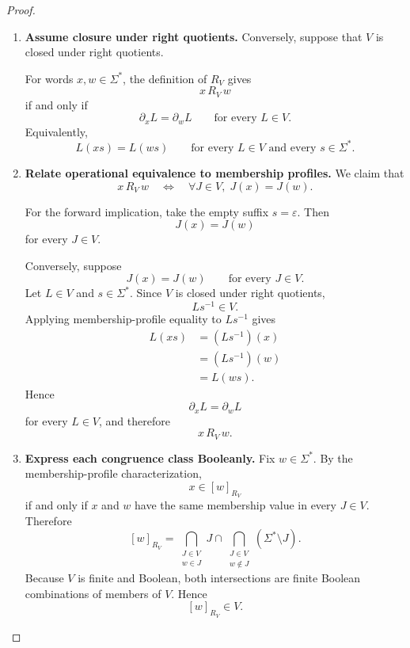 \begin{proof}
\begin{enumerate}
        \item \textbf{Assume closure under right quotients.}
        Conversely, suppose that \(V\) is closed under right quotients.

        For words \(x,w\in\Sigma^*\), the definition of \(R_V\) gives
        \[
            x\,R_V\,w
        \]
        if and only if
        \[
            \partial_xL
            =
            \partial_wL
            \qquad
            \text{for every }L\in V.
        \]
        Equivalently,
        \[
            L(xs)=L(ws)
            \qquad
            \text{for every }L\in V
            \text{ and every }s\in\Sigma^*.
        \]

        \item \textbf{Relate operational equivalence to membership profiles.}
        We claim that
        \[
            x\,R_V\,w
            \quad\Longleftrightarrow\quad
            \forall J\in V,\;
            J(x)=J(w).
        \]

        For the forward implication, take the empty suffix
        \(s=\varepsilon\). Then
        \[
            J(x)=J(w)
        \]
        for every \(J\in V\).

        Conversely, suppose
        \[
            J(x)=J(w)
            \qquad
            \text{for every }J\in V.
        \]
        Let \(L\in V\) and \(s\in\Sigma^*\). Since \(V\) is closed under right
        quotients,
        \[
            Ls^{-1}\in V.
        \]
        Applying membership-profile equality to \(Ls^{-1}\) gives
        \[
        \begin{aligned}
            L(xs)
            &=
            (Ls^{-1})(x)
            \\
            &=
            (Ls^{-1})(w)
            \\
            &=
            L(ws).
        \end{aligned}
        \]
        Hence
        \[
            \partial_xL=\partial_wL
        \]
        for every \(L\in V\), and therefore
        \[
            x\,R_V\,w.
        \]

        \item \textbf{Express each congruence class Booleanly.}
        Fix \(w\in\Sigma^*\). By the membership-profile characterization,
        \[
            x\in[w]_{R_V}
        \]
        if and only if \(x\) and \(w\) have the same membership value in
        every \(J\in V\). Therefore
        \[
            [w]_{R_V}
            =
            \bigcap_{\substack{J\in V\\w\in J}}J
            \cap
            \bigcap_{\substack{J\in V\\w\notin J}}
            (\Sigma^*\setminus J).
        \]
        Because \(V\) is finite and Boolean, both intersections are finite
        Boolean combinations of members of \(V\). Hence
        \[
            [w]_{R_V}\in V.
        \]


\end{enumerate}
\end{proof}
